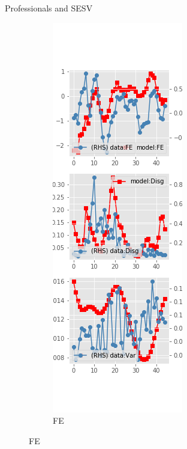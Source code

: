 \documentclass{beamer}
\begin{document}
\begin{frame}{Professionals and SESV}
	\begin{figure}[ht]
		\label{SESV_diag_SPF}
		\begin{subfigure}[b]{0.2\textwidth}
			\centering
			\caption{FE}
			\includegraphics[width=\textwidth, height = 0.8\textheight]{figuresDraft/spf_se_est_sv_diag0.png}

\end{subfigure}
\end{figure}
\end{frame}
\end{document}
